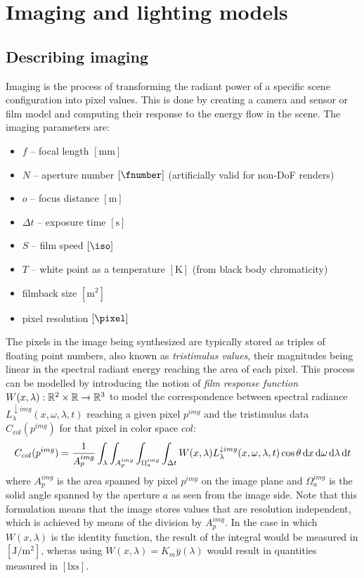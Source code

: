 
\chapter{Imaging and lighting models}\label{ch:lighting}
\section{Describing imaging}\label{ch:imaging}

Imaging is the process of transforming the radiant power of a specific scene
configuration into pixel values. This is done by creating a camera and sensor
or film model and computing their response to the energy flow in the scene.
The imaging parameters are:
\begin{itemize}
\item $f$ -- focal length $[\si{\milli\meter}]$
\item $N$ -- aperture number $[\si{\fnumber}]$  (artificially valid for
non-DoF renders)
\item $o$ -- focus distance $[\si{\meter}]$
\item $\Delta t$ -- exposure time $[\si{\second}]$
\item $S$ -- film speed $[\si{\iso}]$
\item $T$ -- white point as a temperature $[\si{\kelvin}]$  (from black body
chromaticity)
\item filmback size $[\si{\square\meter}]$
\item pixel resolution $[\si{\pixel}]$
\end{itemize}

The pixels in the image being synthesized are typically stored as triples of
floating point numbers, also known as \textsl{tristimulus values}, their
magnitudes being linear in the spectral radiant energy reaching the area of each
pixel.
This process can be modelled by introducing the notion of \textsl{film response
function} $W(x,\lambda): \mathbb{R}^2\times\mathbb{R} \to \mathbb{R}^3$ to model the correspondence
between spectral radiance $L^{\downarrow img}_{\lambda}(x, \omega, \lambda, t)$
reaching a given pixel $p^{img}$ and the tristimulus data $C_{col}(p^{img})$ for
that pixel in color space $col$:
\begin{equation}\label{eqn:imaging1}
C_{col}(p^{img})  = \frac1{A_p^{img}}\int_{\lambda} \int_{A_p^{img}}
\int_{\Omega^{img}_a} \int_{\Delta t} W(x, \lambda) L^{\downarrow
img}_{\lambda}(x, \omega, \lambda, t) \cos\theta\mathop{}\!\mathrm{d} x\mathop{}\!\mathrm{d}\omega\mathop{}\!\mathrm{d}\lambda\mathop{}\!\mathrm{d} t
\end{equation}
where $A_p^{img}$ is the area spanned by pixel $p^{img}$ on the image plane and
$\Omega^{img}_a$ is the solid angle spanned by the aperture $a$ as seen from
the image side.
Note that this formulation means that the image stores values that are
resolution independent, which is achieved by means of the division by
$A_p^{img}$. In the case in which $W(x, \lambda)$ is the identity function, the
result of the integral would be measured in $[\si{\joule\per\square\meter}]$,
wheras using $W(x, \lambda) = K_m \bar y(\lambda)$ would result in quantities
measured in $[\si{\lux\second}]$.

